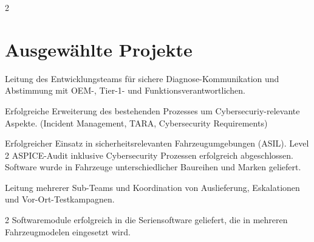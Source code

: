 \begin{paracol}{2}
\section{Ausgewählte Projekte}

\begin{tightemize}
\item Leitung des Entwicklungsteams für sichere Diagnose-Kommunikation und Abstimmung mit OEM-, Tier-1- und Funktionsverantwortlichen.
\item Erfolgreiche Erweiterung des bestehenden Prozesses um Cybersecuriy-relevante Aspekte. (Incident Management, TARA, Cybersecurity Requirements)
\item Erfolgreicher Einsatz in sicherheitsrelevanten Fahrzeugumgebungen (ASIL). Level 2 ASPICE-Audit inklusive Cybersecurity Prozessen erfolgreich abgeschlossen. Software wurde in Fahrzeuge unterschiedlicher Baureihen und Marken geliefert.
\end{tightemize}
\sectionsep


\begin{tightemize}
\item Leitung mehrerer Sub-Teams und Koordination von Auslieferung, Eskalationen und Vor-Ort-Testkampagnen.
\item 2 Softwaremodule erfolgreich in die Seriensoftware geliefert, die in mehreren Fahrzeugmodelen eingesetzt wird.
\end{tightemize}
\sectionsep



\end{paracol}
